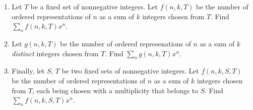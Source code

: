 \begin{exercise}
    \label{ex:2-21}
    \begin{enumerate}[label=(\alph*)]
        \item Let $T$ be a fixed set of nonnegative integers. Let $f(n,k,T)$ be the number of ordered representations of $n$ as a sum of $k$ integers chosen from $T$. Find $\sum_n f(n,k,T)x^n$.
        \item Let $g(n,k,T)$ be the number of ordered represenations of $n$ as a sum of $k$ \emph{distinct} integers chosen from $T$. Find $\sum_n g(n,k,T)x^n$.
        \item Finally, let $S$, $T$ be two fixed sets of nonnegative integers. Let $f(n,k,S,T)$ be the number of ordered representations of $n$ as a sum of $k$ integers chosen from $T$, each being chosen with a multiplicity that belongs to $S$. Find $\sum_n f(n,k,S,T)x^n$.
    \end{enumerate}
\end{exercise}
